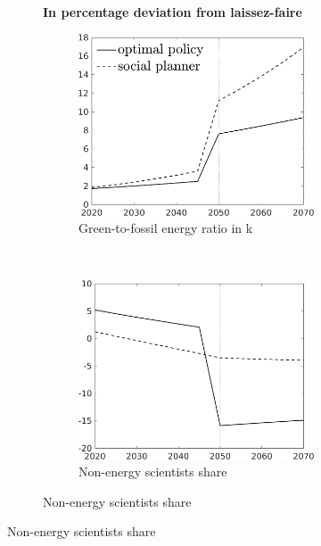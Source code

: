 \begin{figure}[h!!!]
	\centering 	\caption{Efficient and optimal allocation: no knowledge spillovers}\label{fig:optAll_percLf_dyn_noKN_add}
	\begin{subfigure}[]{1\textwidth}	
		\centering\footnotesize{\textbf{In percentage deviation from laissez-faire}}\\ \vspace{2mm}
		\begin{subfigure}[]{0.4\textwidth}
			\caption{Green-to-fossil energy ratio in k }
			\includegraphics[width=1\textwidth]{../../codding_model/own_basedOnFried/optimalPol_010922_revision/figures/all_13Sept22_Tplus30/GFF_PercentageLFDyn_Target_regime4_knspil1_spillover0_noskill0_sep0_xgrowth0_PV1_etaa0.79_lgd1.png}
		\end{subfigure}
	\begin{minipage}[]{0.1\textwidth}
	\ 
\end{minipage}
		\begin{subfigure}[]{0.4\textwidth}
			\caption{Non-energy scientists share }
			\includegraphics[width=1\textwidth]{../../codding_model/own_basedOnFried/optimalPol_010922_revision/figures/all_13Sept22_Tplus30/snS_PercentageLFDyn_Target_regime4_knspil1_spillover0_noskill0_sep0_xgrowth0_PV1_etaa0.79_lgd0.png}

\end{subfigure}
\end{subfigure}
\end{figure}
